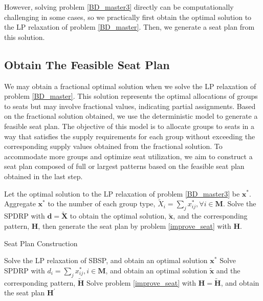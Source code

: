 However, solving problem \eqref{BD_master3} directly can be computationally challenging in some cases, so we practically first obtain the optimal solution to the LP relaxation of problem \eqref{BD_master}. Then, we generate a seat plan from this solution.

\subsection{Obtain The Feasible Seat Plan}\label{seat_assignment}
We may obtain a fractional optimal solution when we solve the LP relaxation of problem \eqref{BD_master}. This solution represents the optimal allocations of groups to seats but may involve fractional values, indicating partial assignments. Based on the fractional solution obtained, we use the deterministic model to generate a feasible seat plan. The objective of this model is to allocate groups to seats in a way that satisfies the supply requirements for each group without exceeding the corresponding supply values obtained from the fractional solution. To accommodate more groups and optimize seat utilization, we aim to construct a seat plan composed of full or largest patterns based on the feasible seat plan obtained in the last step. 


Let the optimal solution to the LP relaxation of problem \eqref{BD_master3} be $\mathbf{x}^{*}$. Aggregate $\mathbf{x}^{*}$ to the number of each group type, $\tilde{X}_{i} =\sum_{j} x^{*}_{ij}, \forall i \in \mathbf{M}$. Solve the SPDRP with $\bm{d} = \bm{\tilde{X}}$ to obtain the optimal solution, $\mathbf{\tilde{x}}$, and the corresponding pattern, $\bm{H}$, then generate the seat plan by problem \eqref{improve_seat} with $\bm{H}$.


\begin{algorithm}
  \caption{Seat Plan Construction}\label{seat_construction}
    {Solve the LP relaxation of SBSP, and obtain an optimal solution $\mathbf{x}^{*}$\;}
    {Solve SPDRP with $d_{i} = \sum_{j} x^{*}_{ij}, i \in \mathbf{M}$, and obtain an optimal solution $\tilde{\mathbf{x}}$ and the corresponding pattern, $\tilde{\bm{H}}$\;}
    {Solve problem \eqref{improve_seat} with $\bm{H} = \tilde{\bm{H}}$, and obtain the seat plan $\bm{H}^{\prime}$\;}
\end{algorithm}
